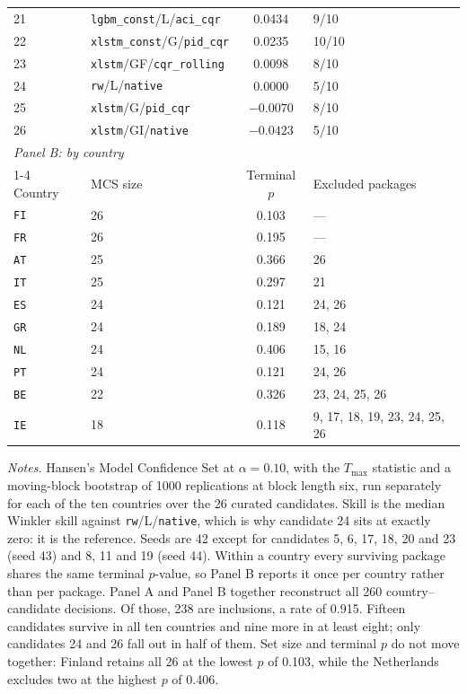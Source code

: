 \begin{table}[t]
\begin{tabular}{llcl}
21 & \texttt{lgbm\_const}/L/\texttt{aci\_cqr} & 0.0434 & 9/10 \\
22 & \texttt{xlstm\_const}/G/\texttt{pid\_cqr} & 0.0235 & 10/10 \\
23 & \texttt{xlstm}/GF/\texttt{cqr\_rolling} & 0.0098 & 8/10 \\
24 & \texttt{rw}/L/\texttt{native} & 0.0000 & 5/10 \\
25 & \texttt{xlstm}/G/\texttt{pid\_cqr} & $-0.0070$ & 8/10 \\
26 & \texttt{xlstm}/GI/\texttt{native} & $-0.0423$ & 5/10 \\
\midrule
\multicolumn{4}{l}{\textit{Panel B: by country}}\\
\cmidrule(lr){1-4}
Country & MCS size & Terminal $p$ & Excluded packages \\
\midrule
\texttt{FI} & 26 & 0.103 & --- \\
\texttt{FR} & 26 & 0.195 & --- \\
\texttt{AT} & 25 & 0.366 & 26 \\
\texttt{IT} & 25 & 0.297 & 21 \\
\texttt{ES} & 24 & 0.121 & 24, 26 \\
\texttt{GR} & 24 & 0.189 & 18, 24 \\
\texttt{NL} & 24 & 0.406 & 15, 16 \\
\texttt{PT} & 24 & 0.121 & 24, 26 \\
\texttt{BE} & 22 & 0.326 & 23, 24, 25, 26 \\
\texttt{IE} & 18 & 0.118 & 9, 17, 18, 19, 23, 24, 25, 26 \\
\bottomrule
\end{tabular}

\vspace{4pt}
{\footnotesize
\begin{minipage}{0.98\textwidth}
\textit{Notes.} Hansen's Model Confidence Set at $\alpha=0.10$, with the $T_{\max}$
statistic and a moving-block bootstrap of 1000 replications at block length six, run
separately for each of the ten countries over the 26 curated candidates. Skill is the
median Winkler skill against \texttt{rw}/L/\texttt{native}, which is why candidate 24
sits at exactly zero: it is the reference. Seeds are 42 except for candidates 5, 6, 17,
18, 20 and 23 (seed 43) and 8, 11 and 19 (seed 44). Within a country every surviving
package shares the same terminal $p$-value, so Panel B reports it once per country
rather than per package. Panel A and Panel B together reconstruct all 260
country--candidate decisions. Of those, 238 are inclusions, a rate of 0.915. Fifteen
candidates survive in all ten countries and nine more in at least eight; only
candidates 24 and 26 fall out in half of them. Set size and terminal $p$ do not move
together: Finland retains all 26 at the lowest $p$ of 0.103, while the Netherlands
excludes two at the highest $p$ of 0.406.
\end{minipage}}
\end{table}

